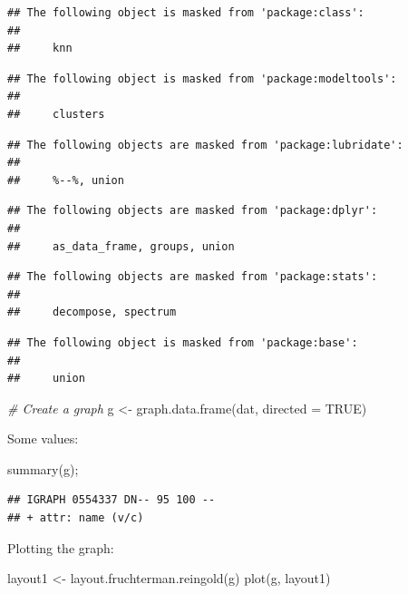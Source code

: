 \documentclass[
]{book}
\newenvironment{Shaded}{\begin{snugshade}}{\end{snugshade}}
\newcommand{\AttributeTok}[1]{\textcolor[rgb]{0.77,0.63,0.00}{#1}}
\newcommand{\CommentTok}[1]{\textcolor[rgb]{0.56,0.35,0.01}{\textit{#1}}}
\newcommand{\ConstantTok}[1]{\textcolor[rgb]{0.00,0.00,0.00}{#1}}
\newcommand{\FunctionTok}[1]{\textcolor[rgb]{0.00,0.00,0.00}{#1}}
\newcommand{\NormalTok}[1]{#1}
\newcommand{\OtherTok}[1]{\textcolor[rgb]{0.56,0.35,0.01}{#1}}
\begin{document}
\begin{verbatim}
## The following object is masked from 'package:class':
## 
##     knn
\end{verbatim}

\begin{verbatim}
## The following object is masked from 'package:modeltools':
## 
##     clusters
\end{verbatim}

\begin{verbatim}
## The following objects are masked from 'package:lubridate':
## 
##     %--%, union
\end{verbatim}

\begin{verbatim}
## The following objects are masked from 'package:dplyr':
## 
##     as_data_frame, groups, union
\end{verbatim}

\begin{verbatim}
## The following objects are masked from 'package:stats':
## 
##     decompose, spectrum
\end{verbatim}

\begin{verbatim}
## The following object is masked from 'package:base':
## 
##     union
\end{verbatim}

\begin{Shaded}
\begin{Highlighting}[]
\CommentTok{\# Create a graph}
\NormalTok{g }\OtherTok{\textless{}{-}} \FunctionTok{graph.data.frame}\NormalTok{(dat, }\AttributeTok{directed =} \ConstantTok{TRUE}\NormalTok{)}
\end{Highlighting}
\end{Shaded}

Some values:

\begin{Shaded}
\begin{Highlighting}[]
\FunctionTok{summary}\NormalTok{(g); }
\end{Highlighting}
\end{Shaded}

\begin{verbatim}
## IGRAPH 0554337 DN-- 95 100 -- 
## + attr: name (v/c)
\end{verbatim}

Plotting the graph:

\begin{Shaded}
\begin{Highlighting}[]
\NormalTok{layout1 }\OtherTok{\textless{}{-}}  \FunctionTok{layout.fruchterman.reingold}\NormalTok{(g)}
\FunctionTok{plot}\NormalTok{(g, layout1)}
\end{Highlighting}
\end{Shaded}
\end{document}
